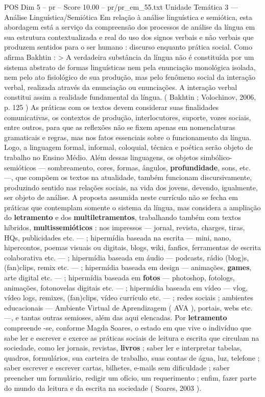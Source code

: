 \begin{textsample}{POS Dim 5 – pr – Score 10.00 – pr/pr\_em\_55.txt}
Unidade Temática 3 — Análise Linguística/Semiótica Em relação à análise linguística e semiótica, esta abordagem está a serviço da compreensão dos processos de análise da língua em sua estrutura contextualizada e real do uso dos signos verbais e não verbais que produzem sentidos para o ser humano : discurso enquanto prática social.
Como afirma Bakhtin : > A verdadeira substância da língua não é constituída por um sistema abstrato de formas linguísticas nem pela enunciação monológica isolada, nem pelo ato fisiológico de sua produção, mas pelo fenômeno social da interação verbal, realizada através da enunciação ou enunciações.
A interação verbal constitui assim a realidade fundamental da língua. ( Bakhtin ; Volochinov, 2006, p. 125 ) As práticas com os textos devem considerar suas finalidades comunicativas, os contextos de produção, interlocutores, suporte, vozes sociais, entre outros, para que as reflexões não se fixem apenas em nomenclaturas gramaticais e regras, mas nos fatos essenciais sobre o funcionamento da língua.
Logo, a linguagem formal, informal, coloquial, técnica e poética serão objeto de trabalho no Ensino Médio.
Além dessas linguagens, os objetos simbólico-semióticos — sombreamento, cores, formas, ângulos, \textbf{profundidade}, sons, etc. —, que compõem os textos na atualidade, também funcionam discursivamente, produzindo sentido nas relações sociais, na vida dos jovens, devendo, igualmente, ser objeto de análise.
A proposta assumida neste currículo não se fecha em práticas que contemplam somente o sistema da língua, mas considera a ampliação do \textbf{letramento} e dos \textbf{multiletramentos}, trabalhando também com textos híbridos, \textbf{multissemióticos} : nos impressos — jornal, revista, charges, tiras, HQs, publicidades etc. — ; hipermídia baseada na escrita — mini, nano, hipercontos, poemas visuais ou digitais, blogs, wiki, fanfics, ferramentas de escrita colaborativa etc. — ; hipermídia baseada em áudio — podcasts, rádio (blog)s, (fan)clips, remix etc. — ; hipermídia baseada em design — animações, \textbf{games}, arte digital etc. — ; hipermídia baseada em \textbf{fotos} — photoshop, fotologs, animações, fotonovelas digitais etc. — ; hipermídia baseada em vídeo — vlog, vídeo logs, remixes, (fan)clips, vídeo currículo etc. — ; redes sociais ; ambientes educacionais — Ambiente Virtual de Aprendizagem ( AVA ), portais, webs etc. —, e tantas outras semioses, além das aqui elencadas.
Por \textbf{letramento} compreende -se, conforme Magda Soares, o estado em que vive o indivíduo que sabe ler e escrever e exerce as práticas sociais de leitura e escrita que circulam na sociedade, como ler jornais, revistas, \textbf{livros} ; saber ler e interpretar tabelas, quadros, formulários, sua carteira de trabalho, suas contas de água, luz, telefone ; saber escrever e escrever cartas, bilhetes, e-mails sem dificuldade ; saber preencher um formulário, redigir um ofício, um requerimento ; enfim, fazer parte do mundo da leitura e da escrita na sociedade ( Soares, 2003 ).

\end{textsample}
